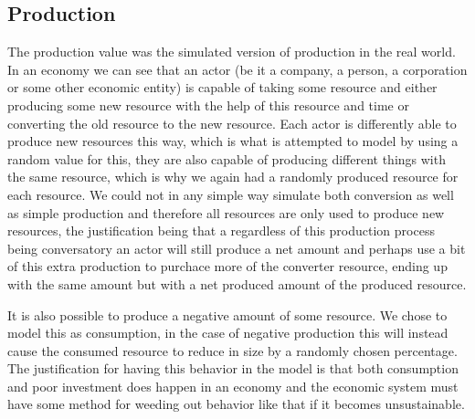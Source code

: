 \documentclass[11p]{article}
\begin{document}
\subsection{Production}
The production value was the simulated version of production in the real world. In an economy we can see that an actor (be it a company, a person, a corporation or some other economic entity) is capable of taking some resource and either producing some new resource with the help of this resource and time or converting the old resource to the new resource. Each actor is differently able to produce new resources this way, which is what is attempted to model by using a random value for this, they are also capable of producing different things with the same resource, which is why we again had a randomly produced resource for each resource. We could not in any simple way simulate both conversion as well as simple production and therefore all resources are only used to produce new resources, the justification being that a regardless of this production process being conversatory an actor will still produce a net amount and perhaps use a bit of this extra production to purchace more of the converter resource, ending up with the same amount but with a net produced amount of the produced resource.

It is also possible to produce a negative amount of some resource. We chose to model this as consumption, in the case of negative production this will instead cause the consumed resource to reduce in size by a randomly chosen percentage. The justification for having this behavior in the model is that both consumption and poor investment does happen in an economy and the economic system must have some method for weeding out behavior like that if it becomes unsustainable.
\end{document}
